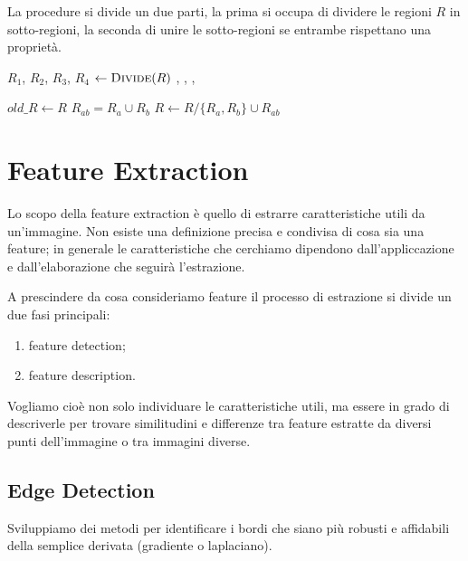 La procedure si divide un due parti, la prima si occupa di dividere le regioni $R$ in sotto-regioni, la seconda di unire le sotto-regioni se entrambe rispettano una proprietà.
\vspace{.1cm}
\begin{algorithmic}
			\State $R_1$, $R_2$, $R_3$, $R_4$ $\gets \Call{Divide}{R}$
			\State {}, , , 
		\EndIf
	\EndFunction    
\end{algorithmic}
\newpage

\begin{algorithmic}
	\DoWhile
		\State $old\_R \gets R$
					\State$R_{ab} = R_a\cup R_b$
					\State $R  \gets R/\{R_a, R_b\} \cup R_{ab}$
				\EndIf
			\EndFor
		\EndFor
	\EndFunction    
\end{algorithmic}

\section{Feature Extraction}
Lo scopo della feature extraction è quello di estrarre caratteristiche utili da un'immagine. Non esiste una definizione precisa  e condivisa di cosa sia una feature; in generale le caratteristiche che cerchiamo dipendono dall'appliccazione e dall'elaborazione che seguirà l'estrazione.

A prescindere da cosa consideriamo feature il processo di estrazione si divide un due fasi principali:
\begin{enumerate}
	\item feature detection;
	\item feature description.
\end{enumerate}
Vogliamo cioè non solo individuare le caratteristiche utili, ma essere in grado di descriverle per trovare similitudini e differenze tra feature estratte da diversi punti dell'immagine o tra immagini diverse.

\subsection{Edge Detection}
Sviluppiamo dei metodi per identificare i bordi che siano più robusti e affidabili della semplice derivata (gradiente o laplaciano).

